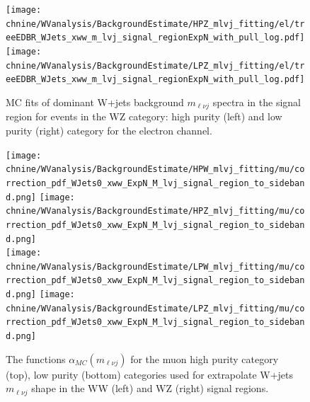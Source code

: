 \begin{figure}[htbp]
\centering
\texttt{[image: \\chnine/WVanalysis/BackgroundEstimate/HPZ\_mlvj\_fitting/el/treeEDBR\_WJets\_xww\_m\_lvj\_signal\_regionExpN\_with\_pull\_log.pdf]}
\texttt{[image: \\chnine/WVanalysis/BackgroundEstimate/LPZ\_mlvj\_fitting/el/treeEDBR\_WJets\_xww\_m\_lvj\_signal\_regionExpN\_with\_pull\_log.pdf]}\\
\caption{MC fits of dominant W+jets background $m_{\ell\nu j}$ spectra in the \mJ signal region for events in the WZ category:
high purity (left) and low purity (right) category for the electron channel.}
\label{fig:srZfitmlvj_2b}
\end{figure}


\begin{figure}[htbp]
\centering
\texttt{[image: \\chnine/WVanalysis/BackgroundEstimate/HPW\_mlvj\_fitting/mu/correction\_pdf\_WJets0\_xww\_ExpN\_M\_lvj\_signal\_region\_to\_sideband.png]}
\texttt{[image: \\chnine/WVanalysis/BackgroundEstimate/HPZ\_mlvj\_fitting/mu/correction\_pdf\_WJets0\_xww\_ExpN\_M\_lvj\_signal\_region\_to\_sideband.png]}\\
\texttt{[image: \\chnine/WVanalysis/BackgroundEstimate/LPW\_mlvj\_fitting/mu/correction\_pdf\_WJets0\_xww\_ExpN\_M\_lvj\_signal\_region\_to\_sideband.png]}
\texttt{[image: \\chnine/WVanalysis/BackgroundEstimate/LPZ\_mlvj\_fitting/mu/correction\_pdf\_WJets0\_xww\_ExpN\_M\_lvj\_signal\_region\_to\_sideband.png]}\\
\caption{The functions $\alpha_{MC}({m_{\ell\nu j}})$ for the muon high purity category (top), low purity (bottom) categories
used for extrapolate W+jets $m_{\ell\nu j}$ shape in the WW (left) and WZ (right) signal regions.}
\label{fig:alphas_VW_1}
\end{figure}


